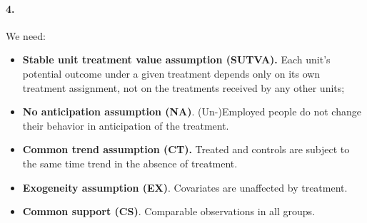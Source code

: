 \documentclass{scrartcl}
\begin{document}
\begin{table}[!h]
\centering
\caption{\label{tab:final_mean_char}Mean observed characheristics by Treatment Group and Period}
\centering
{}
\end{table}

\paragraph*{4.}

We need:

\begin{itemize}[label=$\blacktriangleright$]
    \item \textbf{Stable unit treatment value assumption (SUTVA).} Each unit’s potential outcome under a given treatment depends only on its own treatment assignment, not on the treatments received by any other units;\
    \item \textbf{No anticipation assumption (NA)}. (Un-)Employed people do not change their behavior in anticipation of the treatment. \
    \item \textbf{Common trend assumption (CT).} Treated and controls are subject to the same time trend in the absence of treatment. \
    \item \textbf{Exogeneity assumption (EX)}. Covariates are unaffected by treatment.\ 
    \item \textbf{Common support (CS)}. Comparable observations in all groups.
\end{itemize}
\end{document}
